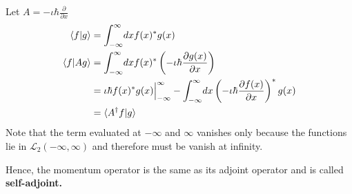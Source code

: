 Let $A=-\iota\hbar \frac{\partial }{\partial x}$
\begin{align*}
    \langle f|g\rangle &= \int_{-\infty}^{\infty}\! dx f(x)^* g(x)  \\
    \langle f| Ag\rangle &= \int_{-\infty}^{\infty}\! dx f(x)^* \left( -\iota \hbar \frac{\partial g(x)}{\partial x}\right)  \\
        &= \iota\hbar f(x)^*g(x)\Big|_{-\infty}^{\infty} - \int_{-\infty}^{\infty}\! dx \left(-\iota \hbar \frac{\partial f(x)}{\partial x}\right)^*g(x) \\
        &= \langle A^\dagger f | g\rangle
\end{align*}
Note that the term evaluated at $-\infty$ and $\infty$ vanishes only because the functions lie in $\mathcal L_2 (-\infty,\infty)$ and therefore must be vanish at infinity.

Hence, the momentum operator is the same as its adjoint operator and is called \textbf{self-adjoint.}

